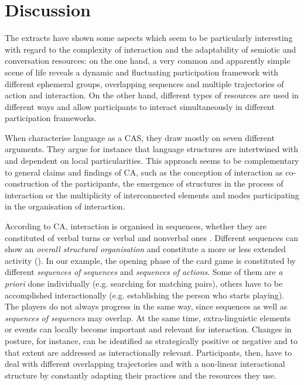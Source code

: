 \documentclass[output=paper]{langscibook}
\begin{document}
\section{Discussion}\label{sec:13:4}

The extracts have shown some aspects which seem to be particularly interesting with regard to the complexity of interaction and the adaptability of semiotic and conversation resources: on the one hand, a very common and apparently simple scene of life reveals a dynamic and fluctuating participation framework with different ephemeral groups, overlapping sequences and multiple trajectories of action and interaction. On the other hand, different types of resources are used in different ways and allow participants to interact simultaneously in different participation frameworks. 

When \citet{BecknerEtAl2009} characterise language as a CAS, they draw mostly on seven different arguments. They argue for instance that language structures are intertwined with and dependent on local particularities. This approach seems to be complementary to general claims and findings of CA, such as the conception of interaction as co-construction of the participants, the emergence of structures in the process of interaction or the multiplicity of interconnected elements and modes participating in the organisation of interaction.

According to CA, interaction is organised in sequences, whether they are constituted of verbal turns or verbal and nonverbal ones \citep{Keevallik2018}. Different sequences can show an \textit{overall structural organisation} \citep{Robinson2013} and constitute a more or less extended activity (\citealt{HeritageSorjonen1994}). In our example, the opening phase of the card game is constituted by different \textit{sequences of sequences} \citep{Schegloff2007} and \textit{sequences of actions}. Some of them are \textit{a priori} done individually (e.g. searching for matching pairs), others have to be accomplished interactionally (e.g. establishing the person who starts playing). The players do not always progress in the same way, since sequences as well as \textit{sequences of sequences} may overlap. At the same time, extra-linguistic elements or events can locally become important and relevant for interaction. Changes in posture, for instance, can be identified as strategically positive or negative and to that extent are addressed as interactionally relevant. Participants, then, have to deal with different overlapping trajectories and with a non-linear interactional structure by constantly adapting their practices and the resources they use. 
\end{document}
